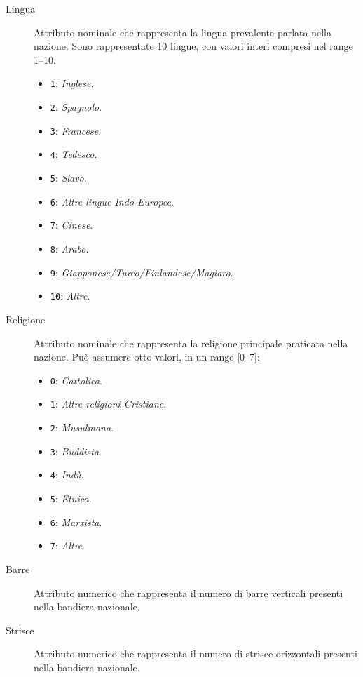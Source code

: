 \documentclass[a4paper,11pt,twoside,notitlepage,final]{scrartcl}
\begin{document}
\begin{description}
  \item[Lingua]
    Attributo nominale che rappresenta la lingua prevalente parlata nella nazione.
    Sono rappresentate 10 lingue, con valori interi compresi nel range {1--10}.
    \begin{itemize}
      \item \texttt{1}: \emph{Inglese}.
      \item \texttt{2}: \emph{Spagnolo}.
      \item \texttt{3}: \emph{Francese}.
      \item \texttt{4}: \emph{Tedesco}.
      \item \texttt{5}: \emph{Slavo}.
      \item \texttt{6}: \emph{Altre lingue Indo-Europee}.
      \item \texttt{7}: \emph{Cinese}.
      \item \texttt{8}: \emph{Arabo}.
      \item \texttt{9}: \emph{Giapponese/Turco/Finlandese/Magiaro}.
      \item \texttt{10}: \emph{Altre}.
    \end{itemize}

  \item[Religione]
    Attributo nominale che rappresenta la religione principale praticata nella nazione.
    Può assumere otto valori, in un range [0--7]:
    \begin{itemize}
      \item \texttt{0}: \emph{Cattolica}.
      \item \texttt{1}: \emph{Altre religioni Cristiane}.
      \item \texttt{2}: \emph{Musulmana}.
      \item \texttt{3}: \emph{Buddista}.
      \item \texttt{4}: \emph{Indù}.
      \item \texttt{5}: \emph{Etnica}.
      \item \texttt{6}: \emph{Marxista}.
      \item \texttt{7}: \emph{Altre}.
    \end{itemize}

  \item[Barre]
    Attributo numerico che rappresenta il numero di barre verticali presenti nella bandiera nazionale.

  \item[Strisce]
  Attributo numerico che rappresenta il numero di strisce orizzontali presenti nella bandiera nazionale.


\end{description}
\end{document}
